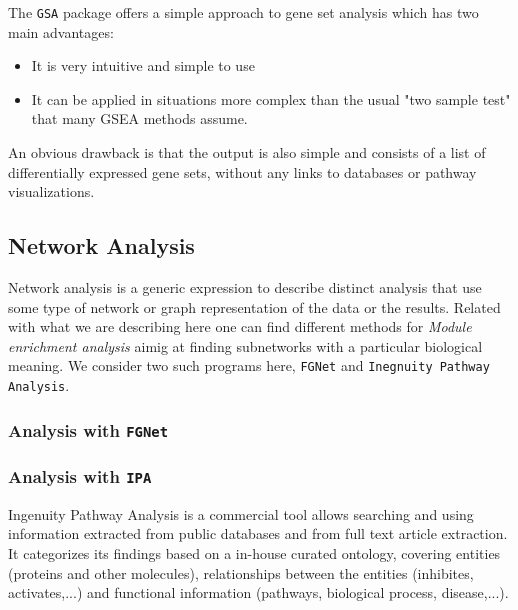 \documentclass{article}\usepackage[]{graphicx}\usepackage[]{color}
\begin{document}
The \texttt{GSA} package offers a simple approach to gene set analysis which has two main advantages:
\begin{itemize}
  \item It is very intuitive and simple to use
  \item It can be applied in situations more complex than the usual "two sample test" that many GSEA methods assume.
\end{itemize}
An obvious drawback is that the output is also simple and consists of a list of differentially expressed gene sets, without any links to databases or pathway visualizations.

\subsection{Network Analysis}

Network analysis is a generic expression to describe distinct analysis that use some type of network or graph representation of the data or the results. Related with what we are describing here one can find different methods for \emph{Module enrichment analysis} aimig at finding subnetworks with a particular biological meaning. We consider two such programs here, \texttt{FGNet} and \texttt{Inegnuity Pathway Analysis}.

\subsubsection{Analysis with \texttt{FGNet}}

\subsubsection{Analysis with \texttt{IPA}}

Ingenuity Pathway Analysis is a commercial tool allows searching and using information extracted from public databases and from full text article extraction. It categorizes its findings based on a in-house curated ontology, covering entities (proteins and other molecules), relationships between the entities (inhibites, activates,...) and functional information (pathways, biological process, disease,...).
\end{document}

